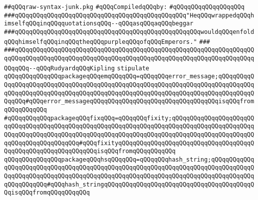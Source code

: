 \label{src/lib/compiler/front/parser/raw-syntax/raw-syntax-junk.pkg}
\verb|##qQQqraw-syntax-junk.pkg|\newline
\newline
\verb|#qQQqCompiledqQQqby:|\newline
\verb|#qQQqqQQqqQQqqQQqqQQq|\newline
\newline
\newline
\newline
\verb|###qQQqqQQqqQQqqQQqqQQqqQQqqQQqqQQqqQQqqQQqqQQqqQQq"HeqQQqwrappedqQQqhimselfqQQqinqQQqquotationsqQQq--qQQqasqQQqaqQQqbeggar|\newline
\verb|###qQQqqQQqqQQqqQQqqQQqqQQqqQQqqQQqqQQqqQQqqQQqqQQqqQQqwouldqQQqenfoldqQQqhimselfqQQqinqQQqtheqQQqpurpleqQQqofqQQqEmperors."|\newline
\verb|###|\newline
\verb|###qQQqqQQqqQQqqQQqqQQqqQQqqQQqqQQqqQQqqQQqqQQqqQQqqQQqqQQqqQQqqQQqqQQqqQQqqQQqqQQqqQQqqQQqqQQqqQQqqQQqqQQqqQQqqQQqqQQqqQQqqQQqqQQqqQQqqQQqqQQqqQQq--qQQqRudyardqQQqKipling|\newline
\newline
\newline
\newline
\verb|stipulate|\newline
\verb|qQQqqQQqqQQqqQQqpackageqQQqemqQQqqQQq=qQQqqQQqerror_message;qQQqqQQqqQQqqQQqqQQqqQQqqQQqqQQqqQQqqQQqqQQqqQQqqQQqqQQqqQQqqQQqqQQqqQQqqQQqqQQqqQQqqQQqqQQqqQQqqQQqqQQqqQQqqQQqqQQqqQQqqQQqqQQqqQQqqQQqqQQqqQQqqQQqqQQqqQQq#qQQqerror_messageqQQqqQQqqQQqqQQqqQQqqQQqqQQqqQQqqQQqisqQQqfromqQQqqQQqqQQq|\newline
\verb|#qQQqqQQqqQQqpackageqQQqfixqQQq=qQQqqQQqfixity;qQQqqQQqqQQqqQQqqQQqqQQqqQQqqQQqqQQqqQQqqQQqqQQqqQQqqQQqqQQqqQQqqQQqqQQqqQQqqQQqqQQqqQQqqQQqqQQqqQQqqQQqqQQqqQQqqQQqqQQqqQQqqQQqqQQqqQQqqQQqqQQqqQQqqQQqqQQqqQQqqQQqqQQqqQQqqQQqqQQqqQQq#qQQqfixityqQQqqQQqqQQqqQQqqQQqqQQqqQQqqQQqqQQqqQQqqQQqqQQqqQQqqQQqqQQqqQQqisqQQqfromqQQqqQQqqQQq|\newline
\verb|qQQqqQQqqQQqqQQqpackageqQQqhsqQQqqQQq=qQQqqQQqhash_string;qQQqqQQqqQQqqQQqqQQqqQQqqQQqqQQqqQQqqQQqqQQqqQQqqQQqqQQqqQQqqQQqqQQqqQQqqQQqqQQqqQQqqQQqqQQqqQQqqQQqqQQqqQQqqQQqqQQqqQQqqQQqqQQqqQQqqQQqqQQqqQQqqQQqqQQqqQQqqQQqqQQq#qQQqhash_stringqQQqqQQqqQQqqQQqqQQqqQQqqQQqqQQqqQQqqQQqqQQqisqQQqfromqQQqqQQqqQQq|\newline
